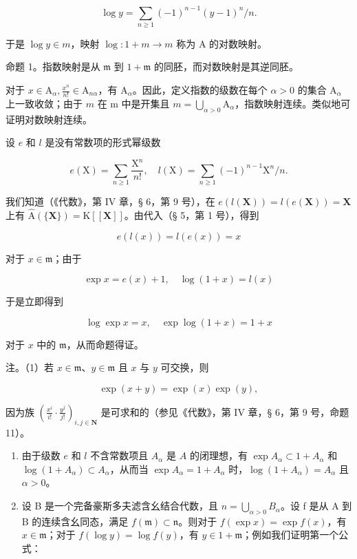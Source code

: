 \[
\log y = \sum_ {n \geqslant 1} (- 1) ^ {n - 1} (y - 1) ^ {n} / n.\tag{2}
\]

于是 \(\log y \in m\)，映射 \(\log: 1 + m \to m\) 称为 A 的对数映射。

命题 1。指数映射是从 \(\mathfrak{m}\) 到 \(1 + \mathfrak{m}\) 的同胚，而对数映射是其逆同胚。

对于 \(x \in \mathrm{A}_{\alpha}, \frac{x^n}{n!} \in \mathrm{A}_{n\alpha}\)，有 \(\mathrm{A}_{\alpha}\)。因此，定义指数的级数在每个 \(\alpha > 0\) 的集合 \(\mathrm{A}_{\alpha}\) 上一致收敛；由于 \(m\) 在 m 中是开集且 \(m = \bigcup_{\alpha > 0} \mathrm{A}_{\alpha}\)，指数映射连续。类似地可证明对数映射连续。

设 \(e\) 和 \(l\) 是没有常数项的形式幂级数

\[
e (\mathrm{X}) = \sum_ {n \geqslant 1} \frac {\mathrm{X} ^ {n}}{n !}, \quad l (\mathrm{X}) = \sum_ {n \geqslant 1} (- 1) ^ {n - 1} \mathrm{X} ^ {n} / n.
\]

我们知道（《代数》，第 IV 章，§ 6，第 9 号），在 \(e(l(\mathbf{X})) = l(e(\mathbf{X})) = \mathbf{X}\) 上有 \(\hat{\mathrm{A}}(\{\mathbf{X}\}) = \mathrm{K}[[\mathbf{X}]]\)。由代入（§ 5，第 1 号），得到

\[
e (l (x)) = l (e (x)) = x
\]

对于 \(x\in \mathfrak{m}\)；由于

\[
\exp x = e (x) + 1, \quad \log (1 + x) = l (x)
\]

于是立即得到

\[
\log \exp x = x, \quad \exp \log (1 + x) = 1 + x
\]

对于 \(x\) 中的 \(\mathfrak{m}\)，从而命题得证。

注。（1）若 \(x \in \mathfrak{m}\)、\(y \in \mathfrak{m}\) 且 \(x\) 与 \(y\) 可交换，则

\[
\exp (x + y) = \exp (x) \exp (y),
\]

因为族 \(\left(\frac{x^i}{i!}\cdot \frac{y^j}{j!}\right)_{i,j\in \mathbf{N}}\) 是可求和的（参见《代数》，第 IV 章，§ 6，第 9 号，命题 11）。

\begin{enumerate}
\def\labelenumi{(\arabic{enumi})}
\setcounter{enumi}{1}
\item
  由于级数 \(e\) 和 \(l\) 不含常数项且 \(A_{\alpha}\) 是 \(A\) 的闭理想，有 \(\exp A_{\alpha} \subset 1 + A_{\alpha}\) 和 \(\log (1 + A_{\alpha}) \subset A_{\alpha}\)，从而当 \(\exp A_{\alpha} = 1 + A_{\alpha}\) 时，\(\log (1 + A_{\alpha}) = A_{\alpha}\) 且 \(\alpha > 0\)。
\item
  设 B 是一个完备豪斯多夫滤含幺结合代数，且 \(n = \bigcup_{\alpha > 0} B_{\alpha}\)。设 f 是从 A 到 B 的连续含幺同态，满足 \(f(\mathfrak{m}) \subset \mathfrak{n}\)。则对于 \(f(\exp x) = \exp f(x)\)，有 \(x \in \mathfrak{m}\)；对于 \(f(\log y) = \log f(y)\)，有 \(y \in 1 + \mathfrak{m}\)；例如我们证明第一个公式：
\end{enumerate}

